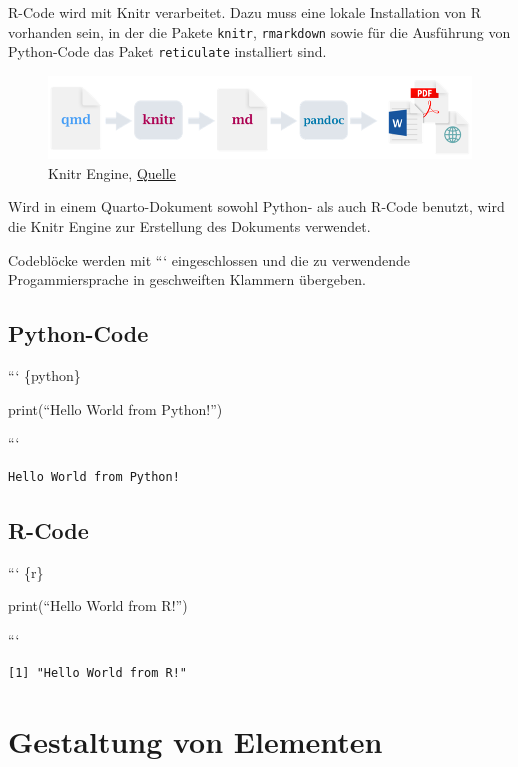\documentclass[
  letterpaper,
  DIV=11]{scrartcl}
\begin{document}
R-Code wird mit Knitr verarbeitet. Dazu muss eine lokale Installation
von R vorhanden sein, in der die Pakete \texttt{knitr},
\texttt{rmarkdown} sowie für die Ausführung von Python-Code das Paket
\texttt{reticulate} installiert sind.

\begin{figure}[H]

{\centering \includegraphics{skript/00-bilder/Renderpfad_Knitr.png}

}

\caption{Knitr Engine,
\href{https://quarto.org/docs/get-started/hello/rstudio.html\#how-it-works}{Quelle}}

\end{figure}%

Wird in einem Quarto-Dokument sowohl Python- als auch R-Code benutzt,
wird die Knitr Engine zur Erstellung des Dokuments verwendet.

Codeblöcke werden mit ``` eingeschlossen und die zu verwendende
Progammiersprache in geschweiften Klammern übergeben.

\subsection{Python-Code}

``` \{python\}

print(``Hello World from Python!'')

```

\begin{verbatim}
Hello World from Python!
\end{verbatim}

\subsection{R-Code}

``` \{r\}

print(``Hello World from R!'')

```

\begin{verbatim}
[1] "Hello World from R!"
\end{verbatim}

\section{Gestaltung von Elementen}\label{sec-Elemente}
\end{document}
